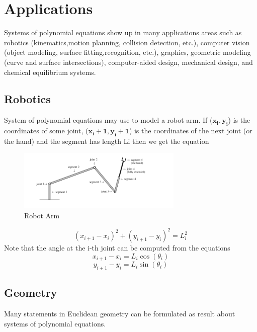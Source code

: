 \documentclass[11pt]{article}
\begin{document}
\section{Applications}
Systems of polynomial equations show up in many applications areas such as robotics (kinematics,motion planning, collision detection, etc.), computer vision (object modeling, surface fitting,recognition, etc.), graphics, geometric modeling (curve and surface intersections), computer-aided design, mechanical design, and chemical equilibrium systems. \cite{yanbinjiaArticle}
\subsection{Robotics}
System of polynomial equations may use to model a robot arm. If  ($\mathbf{x_i, y_i}$) is the coordinates of some joint,  ($\mathbf{x_i+1, y_i+1}$) is the coordinates of the next joint (or the hand) and the segment has length Li then we get the equation \cite{richterArticle}
\begin{figure}[H]
  \begin{center}
    \includegraphics[width=0.70\textwidth]{robotarm.png}
    \caption{Robot Arm}
    \label{fig: Robot Arm}
  \end{center}
\end{figure}

 \begin{equation}
    (x_{i+1}-x_i)^2 + (y_{i+1}-y_i)^2=L_i^2
\end{equation}
Note that the angle at the i-th joint can be computed from the equations
 \begin{equation}
    x_{i+1}-x_i = L_i \cos(\theta_i)
\end{equation}
 \begin{equation}
    y_{i+1}-y_i = L_i \sin(\theta_i)
\end{equation}

\subsection{Geometry}
Many statements in Euclidean geometry can be formulated as result about systems of polynomial equations.\cite{richterArticle}
\end{document}
